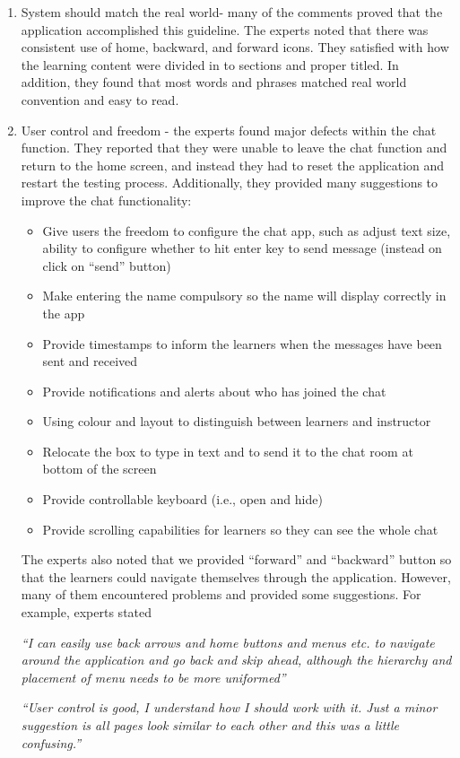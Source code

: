 \begin{enumerate}
\item System should match the real world- many of the comments proved that the application accomplished this guideline. The experts noted that there was consistent use of home, backward, and forward icons. They satisfied with how the learning content were divided in to sections and proper titled. In addition, they found that most words and phrases matched real world convention and easy to read. 

\item User control and freedom - the experts found major defects within the chat function. They reported that they were unable to leave the chat function and return to the home screen, and instead they had to reset the application and restart the testing process. Additionally, they provided many suggestions to improve the chat functionality: 

\begin{itemize} 
\item Give users the freedom to configure the chat app, such as adjust text size, ability to configure whether to hit enter key to send message (instead on click on ``send'' button)
\item Make entering the name compulsory so the name will display correctly in the app
\item Provide timestamps to inform the learners when the messages have been sent and received
\item Provide notifications and alerts about who has joined the chat
\item Using colour and layout to distinguish between learners and instructor 
\item Relocate the box to type in text and to send it to the chat room at bottom of the screen
\item Provide controllable keyboard (i.e., open and hide) 
\item Provide scrolling capabilities for learners so they can see the whole chat 
\end{itemize}

The experts also noted that we provided ``forward'' and ``backward'' button so that the learners could navigate themselves through the application. However, many of them encountered problems and provided some suggestions. For example, experts stated 
\begin{addmargin}[1.5em]{1.5em}
\textit{``I can easily use back arrows and home buttons and menus etc. to navigate around the application and go back and skip ahead, although the hierarchy and placement of menu needs to be more uniformed''}\end{addmargin}
\begin{addmargin}[1.5em]{1.5em}
\textit{``User control is good, I understand how I should work with it. Just a minor suggestion is all pages look similar to each other and this was a little confusing.''}\end{addmargin} 


\end{enumerate}
